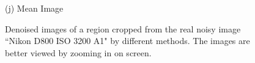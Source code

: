 \documentclass[10pt,onecolumn,letterpaper]{article}
\begin{document}
\begin{figure}[H]
{\begin{minipage}[t]{0.196\textwidth}
{\footnotesize (j) Mean Image \cite{crosschannel2016} }
\end{minipage}
}
\caption{Denoised images of a region cropped from the real noisy image ``Nikon D800 ISO 3200 A1" \cite{crosschannel2016} by different methods. The images are better viewed by zooming in on screen.} 
\label{fig16}
\end{figure}

\begin{figure}[H]\vspace{1mm}
\centering
{}
\end{figure}
\end{document}
